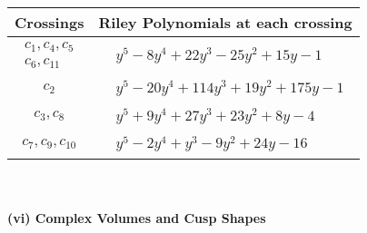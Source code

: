 \documentclass[1p]{elsarticle_modified}
\theoremstyle{definition}
\begin{document}
\begin{tabular}{m{50pt}|m{274pt}}
Crossings & \hspace{64pt}Riley Polynomials at each crossing \\
\hline $$\begin{aligned}c_{1},c_{4},c_{5}\\c_{6},c_{11}\end{aligned}$$&$\begin{aligned}
&y^5-8 y^4+22 y^3-25 y^2+15 y-1
\end{aligned}$\\
\hline $$\begin{aligned}c_{2}\end{aligned}$$&$\begin{aligned}
&y^5-20 y^4+114 y^3+19 y^2+175 y-1
\end{aligned}$\\
\hline $$\begin{aligned}c_{3},c_{8}\end{aligned}$$&$\begin{aligned}
&y^5+9 y^4+27 y^3+23 y^2+8 y-4
\end{aligned}$\\
\hline $$\begin{aligned}c_{7},c_{9},c_{10}\end{aligned}$$&$\begin{aligned}
&y^5-2 y^4+y^3-9 y^2+24 y-16
\end{aligned}$\\
\hline
\end{tabular}\\~\\
\newpage\flushleft \textbf{(vi) Complex Volumes and Cusp Shapes}
\end{document}
